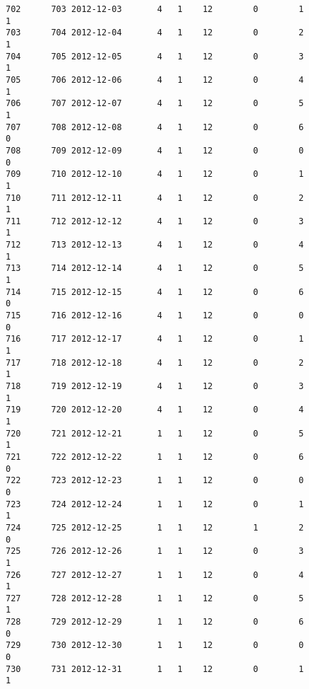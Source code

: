 \documentclass[11pt]{article}
\begin{document}
\begin{Verbatim}[commandchars=\\\{\}]
702      703 2012-12-03       4   1    12        0        1           1   
703      704 2012-12-04       4   1    12        0        2           1   
704      705 2012-12-05       4   1    12        0        3           1   
705      706 2012-12-06       4   1    12        0        4           1   
706      707 2012-12-07       4   1    12        0        5           1   
707      708 2012-12-08       4   1    12        0        6           0   
708      709 2012-12-09       4   1    12        0        0           0   
709      710 2012-12-10       4   1    12        0        1           1   
710      711 2012-12-11       4   1    12        0        2           1   
711      712 2012-12-12       4   1    12        0        3           1   
712      713 2012-12-13       4   1    12        0        4           1   
713      714 2012-12-14       4   1    12        0        5           1   
714      715 2012-12-15       4   1    12        0        6           0   
715      716 2012-12-16       4   1    12        0        0           0   
716      717 2012-12-17       4   1    12        0        1           1   
717      718 2012-12-18       4   1    12        0        2           1   
718      719 2012-12-19       4   1    12        0        3           1   
719      720 2012-12-20       4   1    12        0        4           1   
720      721 2012-12-21       1   1    12        0        5           1   
721      722 2012-12-22       1   1    12        0        6           0   
722      723 2012-12-23       1   1    12        0        0           0   
723      724 2012-12-24       1   1    12        0        1           1   
724      725 2012-12-25       1   1    12        1        2           0   
725      726 2012-12-26       1   1    12        0        3           1   
726      727 2012-12-27       1   1    12        0        4           1   
727      728 2012-12-28       1   1    12        0        5           1   
728      729 2012-12-29       1   1    12        0        6           0   
729      730 2012-12-30       1   1    12        0        0           0   
730      731 2012-12-31       1   1    12        0        1           1   


\end{Verbatim}
\end{document}
